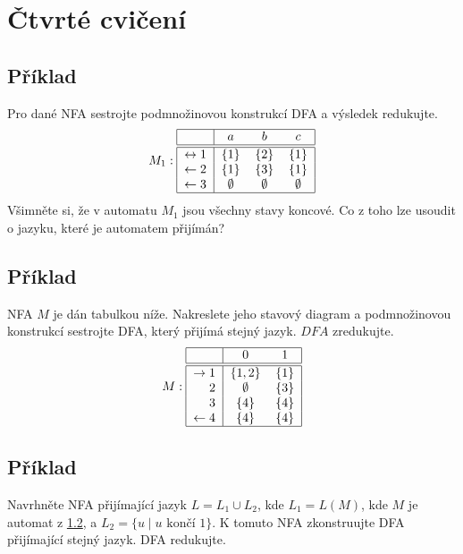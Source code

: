 \section{Čtvrté cvičení}

\subsection{Příklad}
Pro dané NFA sestrojte podmnožinovou konstrukcí DFA a výsledek redukujte.
\[
M_1:
\begin{tabular}{|r|c c c|}
    \hline
    & $a$ & $b$ & $c$\\
    \hline
    \hline
    $\leftrightarrow 1$& $\{1\}$ & $\{2\}$& $\{1\}$\\
    $\leftarrow2$      & $\{1\}$ & $\{3\}$& $\{1\}$\\
    $\leftarrow3$      & $\emptyset$ & $\emptyset$& $\emptyset$\\
    \hline
\end{tabular}
\]
Všimněte si, že v automatu $M_1$ jsou všechny stavy koncové. Co z toho lze usoudit o jazyku, které je automatem přijímán?

\subsection{Příklad} \label{4.2}
NFA $M$ je dán tabulkou níže. Nakreslete jeho stavový diagram a podmnožinovou konstrukcí sestrojte DFA, který přijímá 
stejný jazyk. $DFA$ zredukujte.
\[
M:
\begin{tabular}{|r|c c|}
    \hline
    & $0$ & $1$\\
    \hline
    \hline
    $\rightarrow 1$& $\{1,2\}$ & $\{1\}$\\
    $2$            & $\emptyset$ & $\{3\}$\\
    $3$            & $\{4\}$ & $\{4\}$\\
    $\leftarrow4$  & $\{4\}$ & $\{4\}$\\
    \hline
\end{tabular}
\]

\subsection{Příklad}
Navrhněte NFA přijímající jazyk $L= L_1 \cup L_2$, kde $L_1 = L(M)$, kde $M$ je automat z \ref{4.2}, a 
${L_2 = \{u \mid u \text{ končí } 1\}}$. K tomuto NFA zkonstruujte DFA přijímající stejný jazyk. DFA redukujte.

